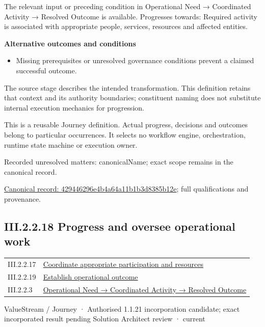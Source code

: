 The relevant input or preceding condition in Operational Need → Coordinated Activity → Resolved Outcome is available. Progresses towards: Required activity is associated with appropriate people, services, resources and affected entities.



\par\medskip\textbf{Alternative outcomes and conditions}\par


\begin{itemize}


\item Missing prerequisites or unresolved governance conditions prevent a claimed successful outcome.

\end{itemize}


The source stage describes the intended transformation. This definition retains that context and its authority boundaries; constituent naming does not substitute internal execution mechanics for progression.



This is a reusable Journey definition. Actual progress, decisions and outcomes belong to particular occurrences. It selects no workflow engine, orchestration, runtime state machine or execution owner.


{\small Recorded unresolved matters: canonicalName; exact scope remains in the canonical record.}\par
{\footnotesize \href{../../../../continuum/strategy/value-stream/429446296e4b4a64a11b1b3d8385b12e.md}{Canonical record: 429446296e4b4a64a11b1b3d8385b12e}; full qualifications and provenance.}\par
\subsection*{III.2.2.18 Progress and oversee operational work}
\label{navigation:III.2.2.18}

\begin{longtable}{p{.22\linewidth}p{.73\linewidth}}
III.2.2.17 & \hyperref[element:429446296e4b4a64a11b1b3d8385b12e]{Coordinate appropriate participation and resources} \\
III.2.2.19 & \hyperref[element:79f756815e3645eb82a150870dc12502]{Establish operational outcome} \\
III.2.2.3 & \hyperref[element:beea615ca7b34bbcbd0ad3a2a6ab2cff]{Operational Need → Coordinated Activity → Resolved Outcome} \\
\end{longtable}
\label{element:b404dffef05e4f2bb9d414e4d1ed33af}
{\small ValueStream / Journey · Authorised 1.1.21 incorporation candidate; exact incorporated result pending Solution Architect review · current}\par

